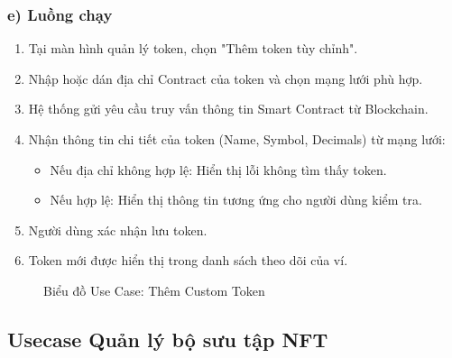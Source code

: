 \documentclass[a4paper]{report}
\begin{document}
\subsubsection{e) Luồng chạy}
\begin{enumerate}
    \item Tại màn hình quản lý token, chọn "Thêm token tùy chỉnh".
    \item Nhập hoặc dán địa chỉ Contract của token và chọn mạng lưới phù hợp.
    \item Hệ thống gửi yêu cầu truy vấn thông tin Smart Contract từ Blockchain.
    \item Nhận thông tin chi tiết của token (Name, Symbol, Decimals) từ mạng lưới:
    \begin{itemize}
        \item Nếu địa chỉ không hợp lệ: Hiển thị lỗi không tìm thấy token.
        \item Nếu hợp lệ: Hiển thị thông tin tương ứng cho người dùng kiểm tra.
    \end{itemize}
    \item Người dùng xác nhận lưu token.
    \item Token mới được hiển thị trong danh sách theo dõi của ví.
\end{enumerate}

\begin{figure}[h]
    \centering
    \caption{Biểu đồ Use Case: Thêm Custom Token}
    \label{fig:uc-custom-token}
\end{figure}
\subsection{Usecase Quản lý bộ sưu tập NFT}
\end{document}
